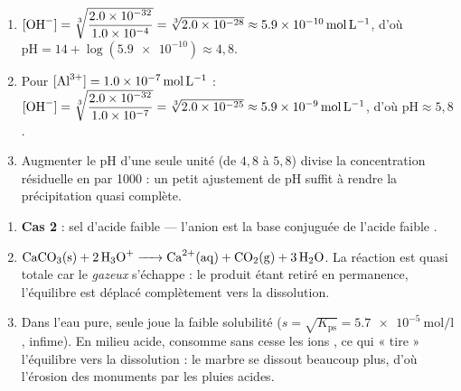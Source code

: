 \documentclass[11pt,a4paper]{article}
\begin{document}
\begin{corrige}
\begin{enumerate}[label=\alph*)]
  \item $[\ce{OH-}]=\sqrt[3]{\dfrac{\num{2.0e-32}}{\num{1.0e-4}}}=\sqrt[3]{\num{2.0e-28}}
        \approx\qty{5.9e-10}{\mole\per\litre}$, d'où $\mathrm{pH}=14+\log(\num{5.9e-10})\approx 4{,}8$.
  \item Pour $[\ce{Al^{3+}}]=\qty{1.0e-7}{\mole\per\litre}$ :
        $[\ce{OH-}]=\sqrt[3]{\dfrac{\num{2.0e-32}}{\num{1.0e-7}}}=\sqrt[3]{\num{2.0e-25}}
        \approx\qty{5.9e-9}{\mole\per\litre}$, d'où $\mathrm{pH}\approx 5{,}8$.
  \item Augmenter le pH d'une seule unité (de $4{,}8$ à $5{,}8$) divise la concentration résiduelle en
         par \num{1000} : un petit ajustement de pH suffit à rendre la précipitation quasi
        complète.
\end{enumerate}
\end{corrige}

\begin{corrige}
\begin{enumerate}[label=\alph*)]
  \item \textbf{Cas 2} : sel d'acide faible — l'anion  est la base conjuguée de l'acide
        faible .
  \item $\ce{CaCO3(s) + 2 H3O+ -> Ca^{2+}(aq) + CO2(g) + 3 H2O}$. La réaction est quasi totale car le
         \emph{gazeux} s'échappe : le produit étant retiré en permanence, l'équilibre est
        déplacé complètement vers la dissolution.
  \item Dans l'eau pure, seule joue la faible solubilité ($s=\sqrt{K_{\mathrm{ps}}}=\qty{5.7e-5}{\mole\per\litre}$,
        infime). En milieu acide,  consomme sans cesse les ions , ce qui « tire »
        l'équilibre vers la dissolution : le marbre se dissout beaucoup plus, d'où l'érosion des
        monuments par les pluies acides.
\end{enumerate}
\end{corrige}
\end{document}
